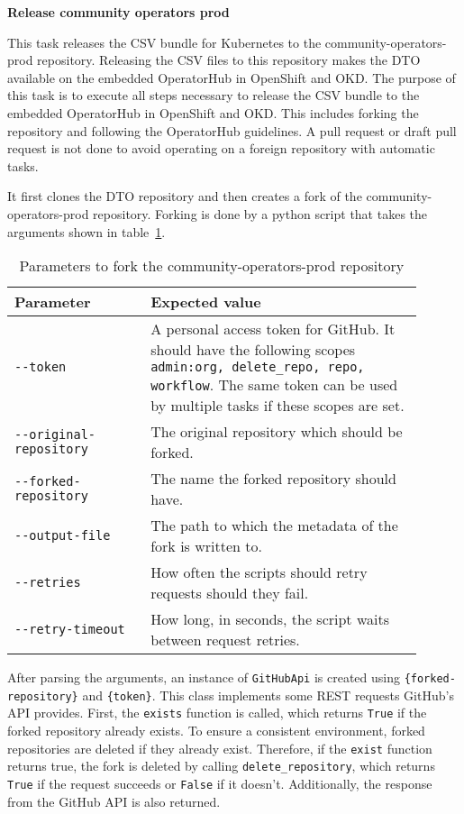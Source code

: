 \textbf{Release community operators prod}

This task releases the CSV bundle for Kubernetes to the community-operators-prod repository.
Releasing the CSV files to this repository makes the DTO available on the embedded OperatorHub in OpenShift and OKD.
The purpose of this task is to execute all steps necessary to release the CSV bundle to the embedded OperatorHub in OpenShift and OKD.
This includes forking the repository and following the OperatorHub guidelines.
A pull request or draft pull request is not done to avoid operating on a foreign repository with automatic tasks.

It first clones the DTO repository and then creates a fork of the community-operators-prod repository.
Forking is done by a python script that takes the arguments shown in table~\ref{tab:parameters-to-fork-the-community-operators-prod-repository}.

\begin{table}[h]
    \centering
    \caption{Parameters to fork the community-operators-prod repository}
    \label{tab:parameters-to-fork-the-community-operators-prod-repository}
    \begin{tabular}{p{0.3\linewidth}|p{0.6\linewidth}}
        Parameter & Expected value \\
        \hline
        \verb|--token| & A personal access token for GitHub.
            It should have the following scopes \verb|admin:org, delete_repo, repo, workflow|.
            The same token can be used by multiple tasks if these scopes are set. \\
        \verb|--original-repository| & The original repository which should be forked. \\
        \verb|--forked-repository| & The name the forked repository should have. \\
        \verb|--output-file| & The path to which the metadata of the fork is written to. \\
        \verb|--retries| & How often the scripts should retry requests should they fail. \\
        \verb|--retry-timeout| & How long, in seconds, the script waits between request retries. \\
    \end{tabular}
\end{table}

After parsing the arguments, an instance of \verb|GitHubApi| is created using \verb|{forked-repository}| and \verb|{token}|.
This class implements some REST requests GitHub's API provides.
First, the \verb|exists| function is called, which returns \verb|True| if the forked repository already exists.
To ensure a consistent environment, forked repositories are deleted if they already exist.
Therefore, if the \verb|exist| function returns true, the fork is deleted by calling \verb|delete_repository|, which returns \verb|True| if the request succeeds or \verb|False| if it doesn't.
Additionally, the response from the GitHub API is also returned.

